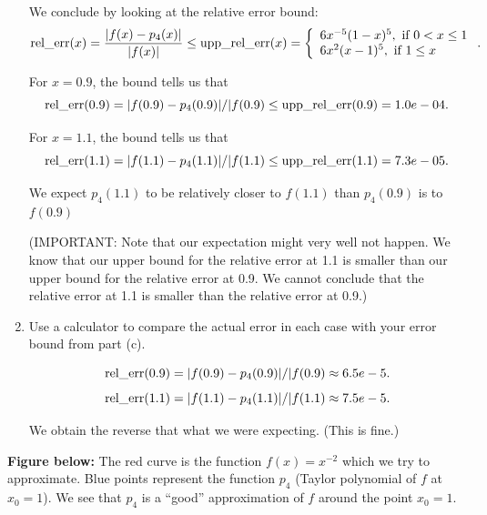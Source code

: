 \documentclass[pdftex,11pt]{article}
\begin{document}
\begin{enumerate}
We conclude by looking at the relative error bound:
$$  \textmd{rel\_err}(x) = \frac{| f(x) -  p_4(x) |}{|f(x)|} \leq  \textmd{upp\_rel\_err}(x) = \left\{ \begin{array}{l}  6 x^{-5}(1-x)^5, \textmd{ if }0<x\leq 1\\  6x^{2} (x-1)^5, \textmd{ if }1\leq x \end{array}\right..$$

For $x=0.9$, the bound tells us that
$$ \textmd{rel\_err}(0.9) = | f(0.9) -  p_4(0.9) |/|f(0.9)  \leq \textmd{upp\_rel\_err}(0.9) = 1.0e-04.$$

For $x=1.1$, the bound tells us that
$$ \textmd{rel\_err}(1.1) = | f(1.1) -  p_4(1.1) |/|f(1.1)  \leq \textmd{upp\_rel\_err}(1.1) =  7.3e-05.$$

We expect $p_4(1.1)$ to be relatively closer to $f(1.1)$ than $p_4(0.9)$ is to $f(0.9)$

(IMPORTANT: Note that our expectation might very well not happen. We know that
our upper bound for the relative error at 1.1 is smaller than our upper bound
for the relative error at 0.9. We cannot conclude that the relative error at
1.1 is smaller than the relative error at 0.9.)

\color{red}\item
Use a calculator to compare the actual error in each case with your error bound
from part (c).\\
\color{black}

$$ \textmd{rel\_err}(0.9) = | f(0.9) -  p_4(0.9) |/|f(0.9)  \approx 6.5e-5.$$
$$ \textmd{rel\_err}(1.1) = | f(1.1) -  p_4(1.1) |/|f(1.1)  \approx 7.5e-5.$$

We obtain the reverse that what we were expecting. (This is fine.)

\end{enumerate}

\textbf{Figure below:} The red curve is the function $f(x)=x^{-2}$ which we try to
approximate. Blue points represent the function $p_4$ (Taylor polynomial of $f$
at $x_0=1$).  We see that $p_4$ is a ``good'' approximation of $f$ around the
point $x_0=1$.
\end{document}
